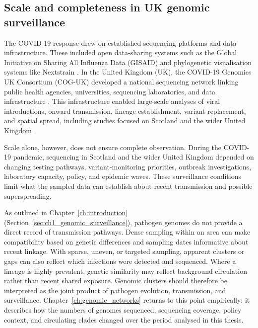 \subsection{Scale and completeness in UK genomic surveillance}\label{sec:ch2_uk_surveillance_scale}

The COVID-19 response drew on established sequencing platforms and data infrastructure. These included open data-sharing systems such as the Global Initiative on Sharing All Influenza Data (GISAID) \citep{Khare2021} and phylogenetic visualisation systems like Nextstrain \citep{Hadfield2018}. In the United Kingdom (UK), the COVID-19 Genomics UK Consortium (COG-UK) developed a national sequencing network linking public health agencies, universities, sequencing laboratories, and data infrastructure \citep{COGUK2020,Nicholls2021}. This infrastructure enabled large-scale analyses of viral introductions, onward transmission, lineage establishment, variant replacement, and spatial spread, including studies focused on Scotland and the wider United Kingdom \citep{daSilvaFilipe2020,duPlessis2021,Lycett2021,Vohringer2021}.

Scale alone, however, does not ensure complete observation. During the COVID-19 pandemic, sequencing in Scotland and the wider United Kingdom depended on changing testing pathways, variant-monitoring priorities, outbreak investigations, laboratory capacity, policy, and epidemic waves. These surveillance conditions limit what the sampled data can establish about recent transmission and possible superspreading.

As outlined in Chapter~\ref{ch:introduction} (Section~\ref{sec:ch1_genomic_surveillance}), pathogen genomes do not provide a direct record of transmission pathways. Dense sampling within an area can make compatibility based on genetic differences and sampling dates informative about recent linkage. With sparse, uneven, or targeted sampling, apparent clusters or gaps can also reflect which infections were detected and sequenced. Where a lineage is highly prevalent, genetic similarity may reflect background circulation rather than recent shared exposure. Genomic clusters should therefore be interpreted as the joint product of pathogen evolution, transmission, and surveillance. Chapter~\ref{ch:genomic_networks} returns to this point empirically: it describes how the numbers of genomes sequenced, sequencing coverage, policy context, and circulating clades changed over the period analysed in this thesis.

